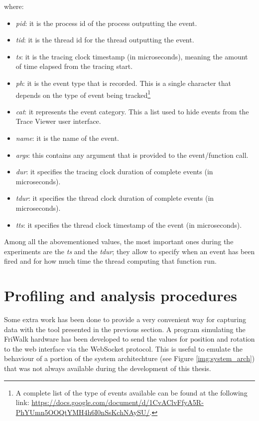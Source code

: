 where:
\begin{itemize}
    \item \emph{pid}: it is the process id of the process outputting the event.
    \item \emph{tid}: it is the thread id for the thread outputting the event.
    \item \emph{ts}: it is the tracing clock timestamp (in microseconds), meaning
        the amount of time elapsed from the tracing start.
    \item \emph{ph}: it is the event type that is recorded. This is a single character
        that depends on the type of event being tracked\footnote{A complete list
        of the type of events available can be found at the following link:
        \url{https://docs.google.com/document/d/1CvAClvFfyA5R-PhYUmn5OOQtYMH4h6I0nSsKchNAySU/}.}
    \item \emph{cat}: it represents the event category. This a list used to hide
        events from the Trace Viewer user interface.
    \item \emph{name}: it is the name of the event.
    \item \emph{args}: this contains any argument that is provided to the event/function
        call.
    \item \emph{dur}: it specifies the tracing clock duration of complete events
        (in microseconds).
    \item \emph{tdur}: it specifies the thread clock duration of complete events
        (in microseconds).
    \item \emph{tts}: it specifies the thread clock timestamp of the event (in
        microseconds).
\end{itemize}

Among all the abovementioned values, the most important ones during the experiments
are the \emph{ts} and the \emph{tdur}; they allow to specify when an event has been
fired and for how much time the thread computing that function run.


\section{Profiling and analysis procedures} \label{sec:procedure}
Some extra work has been done to provide a very convenient way
for capturing data with the tool presented in the previous section. A program
simulating the FriWalk hardware has been developed to send the values for position
and rotation to the web
interface via the WebSocket protocol. This is useful to emulate the behaviour of
a portion of the system architechture (see Figure \ref{img:system_arch}) that was
not always available during the development of this thesis.

